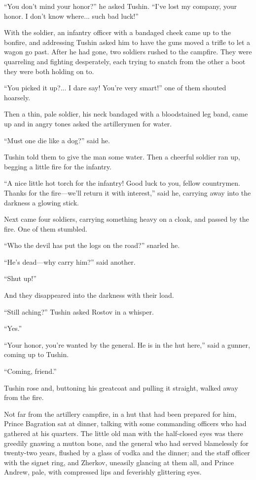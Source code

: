 ``You don't mind your honor?'' he asked Tushin. ``I've lost my
company, your honor. I don't know where... such bad luck!''

With the soldier, an infantry officer with a bandaged cheek came
up to the bonfire, and addressing Tushin asked him to have the
guns moved a trifle to let a wagon go past. After he had gone,
two soldiers rushed to the campfire. They were quarreling and
fighting desperately, each trying to snatch from the other a boot
they were both holding on to.

``You picked it up?... I dare say! You're very smart!'' one of
them shouted hoarsely.

Then a thin, pale soldier, his neck bandaged with a bloodstained
leg band, came up and in angry tones asked the artillerymen for
water.

``Must one die like a dog?'' said he.

Tushin told them to give the man some water. Then a cheerful
soldier ran up, begging a little fire for the infantry.

``A nice little hot torch for the infantry! Good luck to you,
fellow countrymen. Thanks for the fire---we'll return it with
interest,'' said he, carrying away into the darkness a glowing
stick.

Next came four soldiers, carrying something heavy on a cloak, and
passed by the fire. One of them stumbled.

``Who the devil has put the logs on the road?'' snarled he.

``He's dead---why carry him?'' said another.

``Shut up!''

And they disappeared into the darkness with their load.

``Still aching?'' Tushin asked Rostov in a whisper.

``Yes.''

``Your honor, you're wanted by the general. He is in the hut
here,'' said a gunner, coming up to Tushin.

``Coming, friend.''

Tushin rose and, buttoning his greatcoat and pulling it straight,
walked away from the fire.

Not far from the artillery campfire, in a hut that had been
prepared for him, Prince Bagration sat at dinner, talking with
some commanding officers who had gathered at his quarters. The
little old man with the half-closed eyes was there greedily
gnawing a mutton bone, and the general who had served blamelessly
for twenty-two years, flushed by a glass of vodka and the dinner;
and the staff officer with the signet ring, and Zherkov, uneasily
glancing at them all, and Prince Andrew, pale, with compressed
lips and feverishly glittering eyes.

